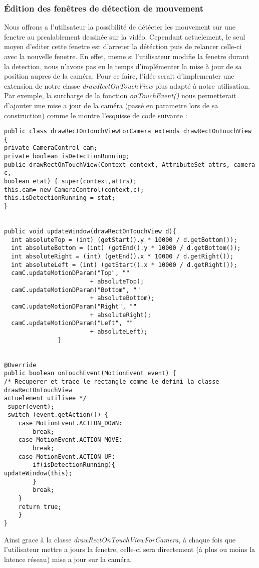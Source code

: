 \subsubsection{Édition des fenêtres de détection  de mouvement}
Nous offrons a l'utilisateur la possibilité de détécter les mouvement sur une
fenetre au prealablement dessinée sur la vidéo. Cependant actuelement, le seul
moyen d'editer cette fenetre est d'arreter la détéction puis de relancer
celle-ci avec la nouvelle fenetre. En effet, meme si l'utilisateur modifie la
fenetre durant la detection, nous n'avons pas eu le temps d'implémenter la mise
à jour de sa position aupres de la caméra.\newline
Pour ce faire, l'idée serait d'implementer une extension de notre classe
\textit{drawRectOnTouchView} plus adapté à notre utilisation. Par exemple, la
surcharge de la fonction \textit{onTouchEvent()} nous permetterait d'ajouter une
mise a jour de la caméra (passé en parametre lors de sa construction) comme le
montre l'esquisse de code suivante : 
\begin{lstlisting}[format=java]
public class drawRectOnTouchViewForCamera extends drawRectOnTouchView {
private CameraControl cam;
private boolean isDetectionRunning;
public drawRectOnTouchView(Context context, AttributeSet attrs, camera c,
boolean etat) { super(context,attrs);
this.cam= new CameraControl(context,c);
this.isDetectionRunning = stat;
}


public void updateWindow(drawRectOnTouchView d){
  int absoluteTop = (int) (getStart().y * 10000 / d.getBottom());
  int absoluteBottom = (int) (getEnd().y * 10000 / d.getBottom());
  int absoluteRight = (int) (getEnd().x * 10000 / d.getRight());
  int absoluteLeft = (int) (getStart().x * 10000 / d.getRight());
  camC.updateMotionDParam("Top", ""
                        + absoluteTop);
  camC.updateMotionDParam("Bottom", ""
                        + absoluteBottom);
  camC.updateMotionDParam("Right", ""
                        + absoluteRight);
  camC.updateMotionDParam("Left", ""
                        + absoluteLeft);
               }         
                        

@Override
public boolean onTouchEvent(MotionEvent event) {
/* Recuperer et trace le rectangle comme le defini la classe drawRectOnTouchView
actuelement utilisee */
 super(event);
 switch (event.getAction()) {
    case MotionEvent.ACTION_DOWN:
        break;
    case MotionEvent.ACTION_MOVE:
        break;
    case MotionEvent.ACTION_UP:
        if(isDetectionRunning){
updateWindow(this);
        }
        break;
    }
    return true;
    }
}
\end{lstlisting}
Ainsi grace à la classe \textit{drawRectOnTouchViewForCamera}, à chaque fois que
l'utilisateur mettre a jours la fenetre, celle-ci sera directement (à plus ou
moins la latence réseau) mise a jour sur la caméra.

